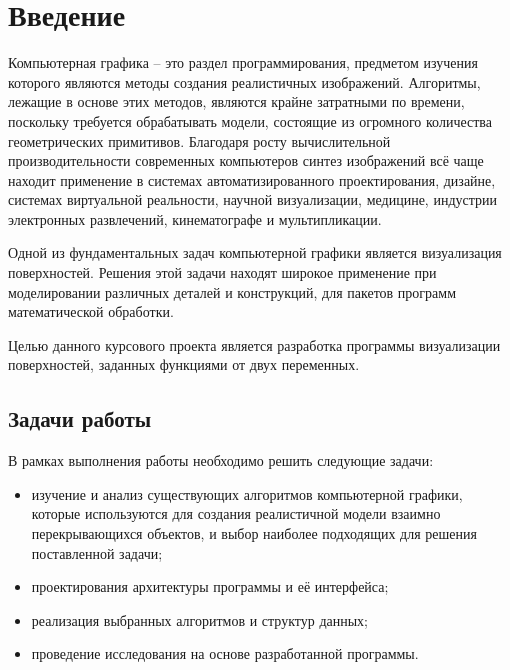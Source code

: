 \chapter*{Введение}

Компьютерная графика – это раздел программирования, предметом изучения которого являются методы создания реалистичных изображений.
Алгоритмы, лежащие в основе этих методов, являются крайне затратными по времени, поскольку требуется обрабатывать модели, состоящие из огромного количества геометрических примитивов.
Благодаря росту вычислительной производительности современных компьютеров синтез изображений всё чаще находит применение в системах автоматизированного проектирования, дизайне, системах виртуальной реальности, научной визуализации, медицине, индустрии электронных развлечений, кинематографе и мультипликации.

Одной из фундаментальных задач компьютерной графики является визуализация поверхностей.
Решения этой задачи находят широкое применение при моделировании различных деталей и конструкций, для пакетов программ математической обработки.

Целью данного курсового проекта является разработка программы визуализации поверхностей, заданных функциями от двух переменных.

\section*{Задачи работы}

В рамках выполнения работы необходимо решить следующие задачи:
\begin{itemize}
	\item изучение и анализ существующих алгоритмов компьютерной графики, которые используются для создания реалистичной модели взаимно перекрывающихся объектов, и выбор наиболее подходящих для решения поставленной задачи;
	\item проектирования архитектуры программы и её интерфейса;
	\item реализация выбранных алгоритмов и структур данных;
	\item проведение исследования на основе разработанной программы.
\end{itemize}
